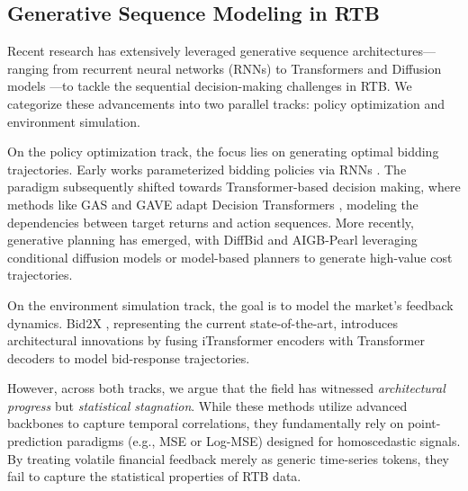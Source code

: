 \documentclass[sigconf, anonymous, review]{acmart}
\begin{document}


\subsection{Generative Sequence Modeling in RTB}
Recent research has extensively leveraged generative sequence architectures—ranging from recurrent neural networks (RNNs) \cite{elman1990finding} to Transformers \cite{vaswani2017attention} and Diffusion models \cite{ho2020denoising}—to tackle the sequential decision-making challenges in RTB. 
We categorize these advancements into two parallel tracks: policy optimization and environment simulation.

On the policy optimization track, the focus lies on generating optimal bidding trajectories.
Early works parameterized bidding policies via RNNs \cite{RNNControl}. 
The paradigm subsequently shifted towards Transformer-based decision making, where methods like GAS \cite{GAS} and GAVE \cite{GAVE} adapt Decision Transformers \cite{chen2021decision}, modeling the dependencies between target returns and action sequences.
More recently, generative planning has emerged, with DiffBid \cite{DiffBid} and AIGB-Pearl \cite{AIGB-Pearl} leveraging conditional diffusion models or model-based planners to generate high-value cost trajectories.

On the environment simulation track, the goal is to model the market's feedback dynamics. Bid2X \cite{Bid2X}, representing the current state-of-the-art, introduces architectural innovations by fusing iTransformer encoders \cite{liu2024itransformer} with Transformer decoders to model bid-response trajectories. 

However, across both tracks, we argue that the field has witnessed \textit{architectural progress} but \textit{statistical stagnation}.
While these methods utilize advanced backbones to capture temporal correlations, they fundamentally rely on point-prediction paradigms (e.g., MSE or Log-MSE) designed for homoscedastic signals.
By treating volatile financial feedback merely as generic time-series tokens, they fail to capture the statistical properties of RTB data.
\end{document}
